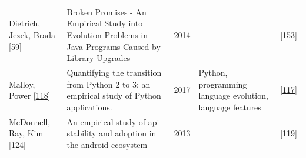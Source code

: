 \documentclass[]{book}
\begin{document}
\begin{longtable}[]{@{}lllll@{}}
\begin{minipage}[t]{0.12\columnwidth}\raggedright\strut
Dietrich, Jezek, Brada
{[}\protect\hyperlink{ref-Dietrich2014}{59}{]}\strut
\end{minipage} & \begin{minipage}[t]{0.31\columnwidth}\raggedright\strut
Broken Promises - An Empirical Study into Evolution Problems in Java
Programs Caused by Library Upgrades\strut
\end{minipage} & \begin{minipage}[t]{0.02\columnwidth}\raggedright\strut
2014\strut
\end{minipage} & \begin{minipage}[t]{0.24\columnwidth}\raggedright\strut
\strut
\end{minipage} & \begin{minipage}[t]{0.16\columnwidth}\raggedright\strut
{[}\protect\hyperlink{ref-Raemaekers2017}{153}{]}\strut
\end{minipage}\tabularnewline
\begin{minipage}[t]{0.12\columnwidth}\raggedright\strut
Malloy, Power {[}\protect\hyperlink{ref-Malloy2017}{118}{]}\strut
\end{minipage} & \begin{minipage}[t]{0.31\columnwidth}\raggedright\strut
Quantifying the transition from Python 2 to 3: an empirical study of
Python applications.\strut
\end{minipage} & \begin{minipage}[t]{0.02\columnwidth}\raggedright\strut
2017\strut
\end{minipage} & \begin{minipage}[t]{0.24\columnwidth}\raggedright\strut
Python, programming language evolution, language features\strut
\end{minipage} & \begin{minipage}[t]{0.16\columnwidth}\raggedright\strut
{[}\protect\hyperlink{ref-Malloy2018}{117}{]}\strut
\end{minipage}\tabularnewline
\begin{minipage}[t]{0.12\columnwidth}\raggedright\strut
McDonnell, Ray, Kim
{[}\protect\hyperlink{ref-McDonnell2013}{124}{]}\strut
\end{minipage} & \begin{minipage}[t]{0.31\columnwidth}\raggedright\strut
An empirical study of api stability and adoption in the android
ecosystem\strut
\end{minipage} & \begin{minipage}[t]{0.02\columnwidth}\raggedright\strut
2013\strut
\end{minipage} & \begin{minipage}[t]{0.24\columnwidth}\raggedright\strut
\strut
\end{minipage} & \begin{minipage}[t]{0.16\columnwidth}\raggedright\strut
{[}\protect\hyperlink{ref-Manikas2016}{119}{]}\strut
\end{minipage}\tabularnewline
\bottomrule
\end{longtable}
\end{document}
